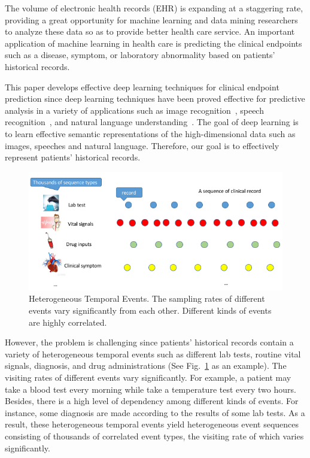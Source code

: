 \documentclass[letterpaper]{article} %
\begin{document}
The volume of electronic health records (EHR) is expanding at a staggering rate, providing a great opportunity for machine learning and data mining researchers to analyze these data so as to provide better health care service. An important application of machine learning in health care is predicting the clinical endpoints such as a disease, symptom, or laboratory abnormality based on patients' historical records.

This paper develops effective deep learning techniques for clinical endpoint prediction since deep learning techniques have been proved effective for predictive analysis in a variety of applications such as image recognition~\cite{he2016deep}, speech recognition~\cite{hinton2012deep}, and natural language understanding~\cite{blunsom2017characters}. The goal of deep learning is to learn effective semantic representations of the high-dimensional data such as images, speeches and natural language. Therefore, our goal is to effectively represent patients' historical records.

\begin{figure}[!t]
\centering
\includegraphics[width=.8\linewidth]{data1.png}

\caption{Heterogeneous Temporal Events. The sampling rates of different events vary significantly from each other. Different kinds of events are highly correlated.}

\label{fig:distr time interval}
\end{figure}

However, the problem is challenging since patients' historical records contain a variety of heterogeneous temporal events such as different lab tests, routine vital signals, diagnosis, and drug administrations (See Fig.~\ref{fig:distr time interval} as an example). The visiting rates of different events vary significantly. For example, a patient may take a blood test every morning while take a temperature test every two hours. Besides, there is a high level of dependency among different kinds of events. For instance, some diagnosis are made according to the results of some lab tests. As a result, these heterogeneous temporal events yield heterogeneous event sequences consisting of thousands of correlated event types, the visiting rate of which varies significantly.
\end{document}
